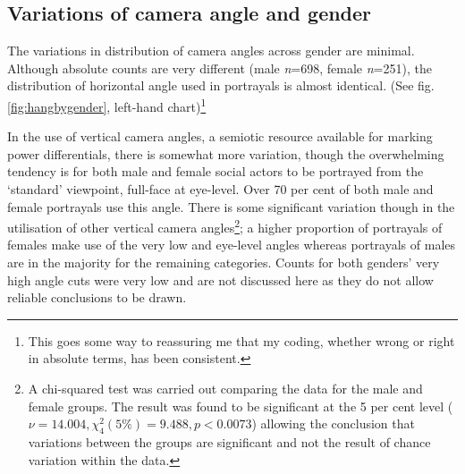 \subsection{Variations of camera angle and gender}
\label{subsec:gen-var}

The variations in distribution of camera angles across gender are minimal. Although absolute counts are very different (male \textit{n}=698, female \textit{n}=251), the distribution of horizontal angle used in portrayals is almost identical. (See fig.\ref{fig:hangbygender}, left-hand chart)\footnote{This goes some way to reassuring me that my coding, whether wrong or right in absolute terms, has been consistent.}

In the use of vertical camera angles, a semiotic resource available for marking power differentials, there is somewhat more variation, though the overwhelming tendency is for both male and female social actors to be portrayed from the `standard' viewpoint, full-face at eye-level. Over 70 per cent of both male and female portrayals use this angle. There is some significant variation though in the utilisation of other vertical camera angles\footnote{A chi-squared test was carried out comparing the data for the male and female groups. The result was found to be significant at the 5 per cent level ($\nu=14.004, \chi^{2}_{4}(5\%)=9.488, p<0.0073$)  allowing the conclusion that variations between the groups are significant and not the result of chance variation within the data.}; a higher proportion of portrayals of females make use of the very low and eye-level angles whereas portrayals of males are in the majority for the remaining categories. Counts for both genders' very high angle cuts were very low and are not discussed here as they do not allow reliable conclusions to be drawn. 

